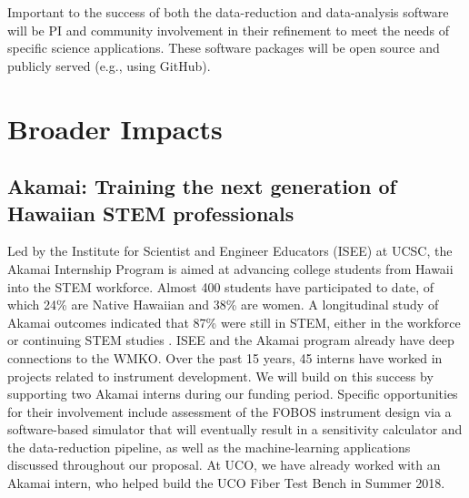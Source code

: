 \documentclass[oneside,11pt]{amsart}
\begin{document}
Important to the success of both the data-reduction and data-analysis
software will be PI and community involvement in their refinement to
meet the needs of specific science applications.  These software
packages will be open source and publicly served (e.g., using GitHub).


\section{Broader Impacts}
\label{sec:bi}


\subsection{Akamai: Training the next generation of Hawaiian STEM
professionals} Led by the Institute for Scientist and Engineer Educators (ISEE) at UCSC, the Akamai Internship Program
is aimed at advancing college students from Hawaii into the STEM workforce.  Almost 400 students have participated to
date, of which 24\% are Native Hawaiian and 38\% are women. A longitudinal study of Akamai outcomes indicated that 87\%
were still in STEM, either in the workforce or continuing STEM studies \citep{asee_peer_31030}.  ISEE and the Akamai
program already have deep connections to the WMKO.  Over the past 15 years, 45 interns have worked in projects related
to instrument development.  We will build on this success by supporting two Akamai interns during our funding period.
Specific opportunities for their involvement include assessment of the FOBOS instrument design via a software-based
simulator that will eventually result in a sensitivity calculator and the data-reduction pipeline, as well as the
machine-learning applications discussed throughout our proposal.  At UCO, we have already worked with an Akamai intern,
who helped build the UCO Fiber Test Bench in Summer 2018. 
\end{document}
